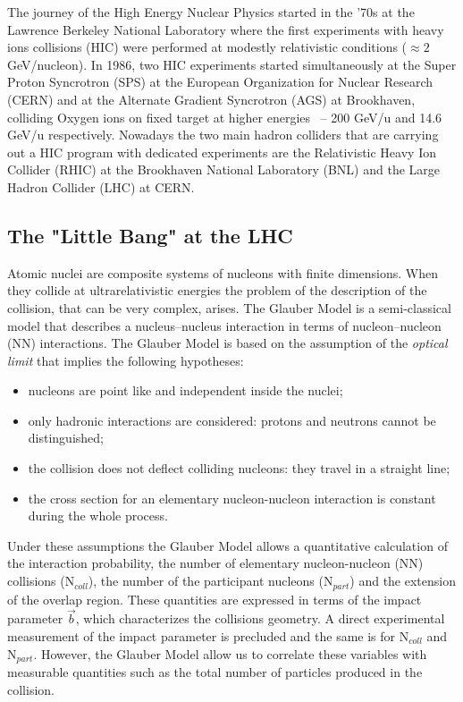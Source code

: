 The journey of the High Energy Nuclear Physics started in the '70s at the Lawrence Berkeley National
Laboratory where the first experiments with heavy ions collisions (HIC) were performed at modestly
relativistic conditions ($\approx 2\ $ GeV/nucleon).
In 1986, two HIC experiments started simultaneously at the Super Proton Syncrotron (SPS) at
the European Organization for Nuclear Research (CERN) and at the Alternate Gradient Syncrotron (AGS)
at Brookhaven, colliding Oxygen ions on fixed target at higher energies \ -- 200 GeV/u and 14.6 GeV/u
respectively.
Nowadays the two main hadron colliders that are carrying out a HIC program with dedicated experiments are the
Relativistic Heavy Ion Collider (RHIC) at the Brookhaven National Laboratory (BNL) and the Large Hadron
Collider (LHC) at CERN.

%
\subsection{The "Little Bang" at the LHC}
\label{sec:1.3.1}

Atomic nuclei are composite systems of nucleons with finite dimensions. When they collide at 
ultrarelativistic energies the problem of the description of the collision, that can be very
complex, arises.
The Glauber Model \cite{glauber} is a semi-classical model that describes a nucleus–nucleus 
interaction in terms of nucleon–nucleon (NN) interactions.
The Glauber Model is based on the assumption of the \textit{optical limit} that implies the following hypotheses:
\begin{itemize}
    \item nucleons are point like and independent inside the nuclei;
    \item only hadronic interactions are considered: protons and neutrons cannot be distinguished;
    \item the collision does not deflect colliding nucleons: they travel in a straight line;
    \item the cross section for an elementary nucleon-nucleon interaction is constant during the whole 
    process.
\end{itemize}
Under these assumptions the Glauber Model allows a quantitative calculation of the interaction
probability, the number of elementary nucleon-nucleon (NN) collisions ($\mathrm{N}_{coll}$), the number
of the participant nucleons ($\mathrm{N}_{part}$) and the extension of the overlap region.
These quantities are expressed in terms of the impact parameter $\vec{b}$, which characterizes
the collisions geometry.
A direct experimental measurement of the impact parameter is precluded and the same is for
$\mathrm{N}_{coll}$ and $\mathrm{N}_{part}$.
However, the Glauber Model allow us to correlate these variables with measurable quantities
such as the total number of particles produced in the collision.

